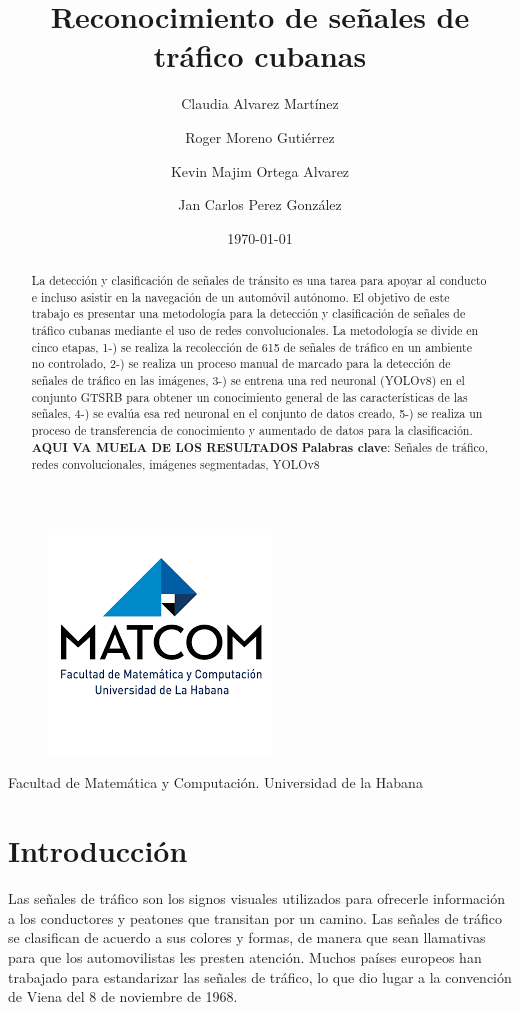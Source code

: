 \documentclass{article}
\title{Reconocimiento de señales de tráfico cubanas}
\author {
Claudia Alvarez Martínez \and
Roger Moreno Gutiérrez \and
Kevin Majim Ortega Alvarez \and
Jan Carlos Perez González
}
\date {\today}
\begin{document}
\begin{figure}[t]
    \centering
    \includegraphics{logo matcompng.png}
\end{figure}
\maketitle
\begin{center}
Facultad de Matemática y Computación. Universidad de la Habana
\end{center}
\newpage
\begin{abstract}
La detección y clasificación de señales de tránsito es una tarea para apoyar al conducto e incluso asistir en la navegación de un automóvil autónomo. El objetivo de este trabajo es presentar una metodología para la detección y clasificación de señales de tráfico cubanas mediante el uso de redes convolucionales. La metodología se divide en cinco etapas, 1-) se realiza la recolección de 615 de señales de tráfico en un ambiente no controlado, 2-) se realiza un proceso manual de marcado para la detección de señales de tráfico en las imágenes, 3-) se entrena una red neuronal (YOLOv8) en el conjunto GTSRB para obtener un conocimiento general de las características de las señales, 4-) se evalúa esa red neuronal en el conjunto de datos creado, 5-) se realiza un proceso de transferencia de conocimiento y aumentado de datos para la clasificación. \textbf{AQUI VA MUELA DE LOS RESULTADOS}
\vfill
\textbf{Palabras clave}: Señales de tráfico, redes convolucionales, imágenes segmentadas, YOLOv8
\end{abstract}
\newpage
\section{Introducción}
Las señales de tráfico son los signos visuales utilizados para ofrecerle información a los conductores y peatones que transitan por un camino. Las señales de tráfico se clasifican de acuerdo a sus colores y formas, de manera que sean llamativas para que los automovilistas les presten atención. Muchos países europeos han trabajado para estandarizar las señales de tráfico, lo que dio lugar a la convención de Viena del 8 de noviembre de 1968. 
\end{document}
